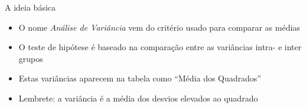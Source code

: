 \documentclass{beamer}
\begin{document}
\begin{frame}{A ideia básica}
  \begin{itemize}
  \item O nome {\em Análise de Variância} vem do critério usado para comparar as médias
  \item O teste de hipótese é baseado na comparação entre as variâncias intra- e inter grupos
  \item Estas variâncias aparecem na tabela como ``Média dos Quadrados''
  \item Lembrete: a variância é a média dos desvios elevados ao quadrado
  \end{itemize}
\end{frame}






\end{document}
